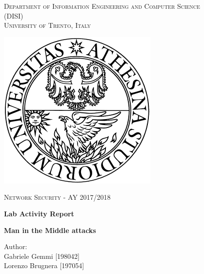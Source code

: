 \begin{titlepage}
	\begin{center}
   	{\scshape\LARGE
    	Department of Information Engineering and Computer Science\\
      	(DISI)\\
      	University of Trento, Italy\\\par}
      	\vspace{1cm}
      	\includegraphics[scale=0.35]{logo}\\
	\vspace{1cm}
	{\scshape\Large Network Security - AY 2017/2018 \par}
	\vspace{1cm}
	{\huge\bfseries Lab Activity Report\\\par}
	\noindent\makebox[\linewidth]{\rule{\linewidth}{0.4pt}}
	{\Large\bfseries Man in the Middle attacks\par}
      	\noindent\makebox[\linewidth]{\rule{\linewidth}{0.4pt}}

        \vspace{.5cm}
        Author: \\
       	Gabriele Gemmi [198042] \\
				Lorenzo Brugnera [197054]
      	\vfill
      	\vfill
	\end{center}
\end{titlepage}
